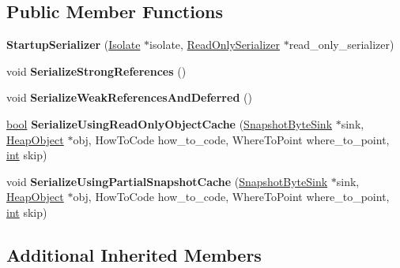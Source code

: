 \subsection*{Public Member Functions}
\begin{DoxyCompactItemize}
\item 
\mbox{\label{classv8_1_1internal_1_1StartupSerializer_a8ed325d462486fbd7b069a2217f1bb96}} 
{\bfseries Startup\+Serializer} (\mbox{\hyperlink{classv8_1_1internal_1_1Isolate}{Isolate}} $\ast$isolate, \mbox{\hyperlink{classv8_1_1internal_1_1ReadOnlySerializer}{Read\+Only\+Serializer}} $\ast$read\+\_\+only\+\_\+serializer)
\item 
\mbox{\label{classv8_1_1internal_1_1StartupSerializer_a17aeff9b7703a64fd9287770445ad20f}} 
void {\bfseries Serialize\+Strong\+References} ()
\item 
\mbox{\label{classv8_1_1internal_1_1StartupSerializer_a886cd4481da7b23b4febb6f0304ef0ea}} 
void {\bfseries Serialize\+Weak\+References\+And\+Deferred} ()
\item 
\mbox{\label{classv8_1_1internal_1_1StartupSerializer_a3e279d5ab9a02576a96ed6de337acd38}} 
\mbox{\hyperlink{classbool}{bool}} {\bfseries Serialize\+Using\+Read\+Only\+Object\+Cache} (\mbox{\hyperlink{classv8_1_1internal_1_1SnapshotByteSink}{Snapshot\+Byte\+Sink}} $\ast$sink, \mbox{\hyperlink{classv8_1_1internal_1_1HeapObject}{Heap\+Object}} $\ast$obj, How\+To\+Code how\+\_\+to\+\_\+code, Where\+To\+Point where\+\_\+to\+\_\+point, \mbox{\hyperlink{classint}{int}} skip)
\item 
\mbox{\label{classv8_1_1internal_1_1StartupSerializer_aa480c5087b6990318c15d34b8882f813}} 
void {\bfseries Serialize\+Using\+Partial\+Snapshot\+Cache} (\mbox{\hyperlink{classv8_1_1internal_1_1SnapshotByteSink}{Snapshot\+Byte\+Sink}} $\ast$sink, \mbox{\hyperlink{classv8_1_1internal_1_1HeapObject}{Heap\+Object}} $\ast$obj, How\+To\+Code how\+\_\+to\+\_\+code, Where\+To\+Point where\+\_\+to\+\_\+point, \mbox{\hyperlink{classint}{int}} skip)
\end{DoxyCompactItemize}
\subsection*{Additional Inherited Members}



